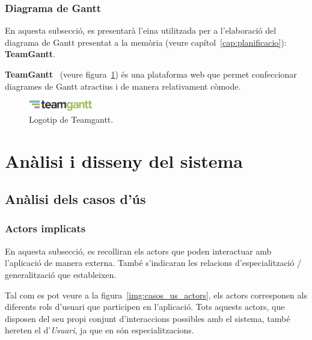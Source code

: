 \documentclass[a4paper,12pt]{ThesisStyle}
\begin{document}
\subsection{Diagrama de Gantt}
\label{subsec:decisions_memoria_gantt}

En aquesta subsecció, es presentarà l'eina utilitzada per a l'elaboració del diagrama de Gantt presentat a la memòria (veure capítol~\ref{cap:planificacio}): \textbf{TeamGantt}.

\textbf{TeamGantt}~\cite{TeamGantt} (veure figura~\ref{img:logo_teamGantt}) és una plataforma web que permet confeccionar diagrames de Gantt atractius i de manera relativament còmode.

\begin{figure}[H]
  \centering
  \includegraphics[width=0.25\textwidth]{assets/logos/teamGantt.png}
  \caption{\label{img:logo_teamGantt}Logotip de Teamgantt.}
\end{figure}


\chapter{Anàlisi i disseny del sistema}
\label{cap:analisi}

\section{Anàlisi dels casos d'ús}
\label{sec:casos_us}

\subsection{Actors implicats}
\label{subsec:casos_us_actors}

En aquesta subsecció, es recolliran els actors que poden interactuar amb l'aplicació de manera externa. També s'indicaran les relacions d'especialització / generalització que estableixen.

Tal com es pot veure a la figura~\ref{img:casos_us_actors}, els actors corresponen als diferents rols d'usuari que participen en l'aplicació. Tots aquests actors, que disposen del seu propi conjunt d'interaccions possibles amb el sistema, també hereten el d'\emph{Usuari}, ja que en són especialitzacions.
\end{document}
